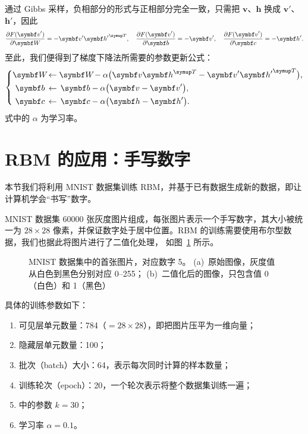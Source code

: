 通过 Gibbs 采样，负相部分的形式与正相部分完全一致，只需把 $\bm{v}$、$\bm{h}$ 换成 $\bm{v}'$、
$\bm{h}'$，因此
\begin{equation}
  \pdv{F(\bm{v}')}{\bm{W}} = - \bm{v}' {\bm{h}'}^\trans \qc
  \pdv{F(\bm{v}')}{\bm{b}} = - \bm{v}' \qc
  \pdv{F(\bm{v}')}{\bm{c}} = - \bm{h}'.
\end{equation}
至此，我们便得到了梯度下降法所需要的参数更新公式：
\begin{equation}
  \left\{
  \begin{aligned}
    \bm{W} \! &\gets \bm{W} \! - \alpha \qty\big(\bm{v} \bm{h}^\trans
                                                 - \bm{v}' {\bm{h}'}^\trans), \\
    \bm{b} \, &\gets \, \bm{b} - \alpha \qty\big(\bm{v} - \bm{v}'), \\
    \bm{c} \, &\gets \, \bm{c} - \alpha \qty\big(\bm{h} - \bm{h}').
  \end{aligned}
  \right.
\end{equation}
式中的 $\alpha$ 为学习率。

\section{RBM 的应用：手写数字}
\label{sec:rbm-mnist}

本节我们将利用 MNIST 数据集训练 RBM，并基于已有数据生成新的数据，即让计算机学会“书写”数字。

MNIST 数据集 \num{60000} 张灰度图片组成，每张图片表示一个手写数字，其大小被统一为 $28 \times 28$
像素，并保证数字处于居中位置。RBM 的训练需要使用布尔型数据，我们也据此将图片进行了二值化处理，
如图~\ref{fig:mnist-image} 所示。

\begin{figure}[htb]
  \centering
  \begin{subfigure}[b]{0.35\textwidth}
    \centering
    \caption{}
  \end{subfigure}
  \begin{subfigure}[b]{0.35\textwidth}
    \centering
    \caption{}
  \end{subfigure}
  \caption{MNIST 数据集中的首张图片，对应数字 5。
    (a)~原始图像，灰度值从白色到黑色分别对应 0--255；
    (b)~二值化后的图像，只包含值 0（白色）和 1（黑色）}
  \label{fig:mnist-image}
\end{figure}

具体的训练参数如下：

\begin{enumerate}
  \item 可见层单元数量：784（$=28 \times 28$），即把图片压平为一维向量；
  \item 隐藏层单元数量：100；
  \item 批次（batch）大小：64，表示每次同时计算的样本数量；
  \item 训练轮次（epoch）：20，一个轮次表示将整个数据集训练一遍；
  \item \CDk{} 中的参数 $k=30$；
  \item 学习率 $\alpha=0.1$。
\end{enumerate}


